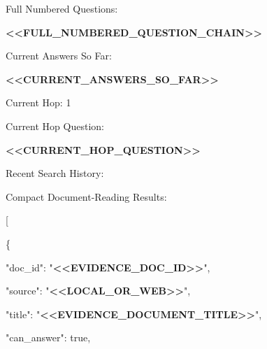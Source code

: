 \begin{tcolorbox}[colback=white, colframe=my-green, coltitle=black, parskip=5mm, title=\textbf{Hop Resolve}, halign=flush left, enhanced, breakable, skin first=enhanced, skin middle=enhanced, skin last=enhanced]
\begin{scriptsize}
\mbox{}\par
Full Numbered Questions:\par
\textcolor{my-green}{\textbf{\textless{}\textless{}FULL\_NUMBERED\_QUESTION\_CHAIN\textgreater{}\textgreater{}}}\par
\mbox{}\par
Current Answers So Far:\par
\textcolor{my-green}{\textbf{\textless{}\textless{}CURRENT\_ANSWERS\_SO\_FAR\textgreater{}\textgreater{}}}\par
\mbox{}\par
Current Hop: 1\par
Current Hop Question:\par
\textcolor{my-green}{\textbf{\textless{}\textless{}CURRENT\_HOP\_QUESTION\textgreater{}\textgreater{}}}\par
\mbox{}\par
Recent Search History:\par
[\par
  \{\par
    "iteration": "\textcolor{my-green}{\textbf{\textless{}\textless{}ITERATION\_INDEX\textgreater{}\textgreater{}}}",\par
    "type": "\textcolor{my-green}{\textbf{\textless{}\textless{}RETRIEVAL\_ACTION\_TYPE\textgreater{}\textgreater{}}}",\par
    "query": "\textcolor{my-green}{\textbf{\textless{}\textless{}VISIBLE\_OR\_LOCAL\_RETRIEVAL\_QUERY\textgreater{}\textgreater{}}}",\par
    "result\_count": "\textcolor{my-green}{\textbf{\textless{}\textless{}N\_RESULTS\textgreater{}\textgreater{}}}"\par
  \}\par
]\par
\mbox{}\par
Compact Document-Reading Results:\par
[\par
  \{\par
    "doc\_id": "\textcolor{my-green}{\textbf{\textless{}\textless{}EVIDENCE\_DOC\_ID\textgreater{}\textgreater{}}}",\par
    "source": "\textcolor{my-green}{\textbf{\textless{}\textless{}LOCAL\_OR\_WEB\textgreater{}\textgreater{}}}",\par
    "title": "\textcolor{my-green}{\textbf{\textless{}\textless{}EVIDENCE\_DOCUMENT\_TITLE\textgreater{}\textgreater{}}}",\par
    "can\_answer": true,\par

\end{scriptsize}
\end{tcolorbox}
